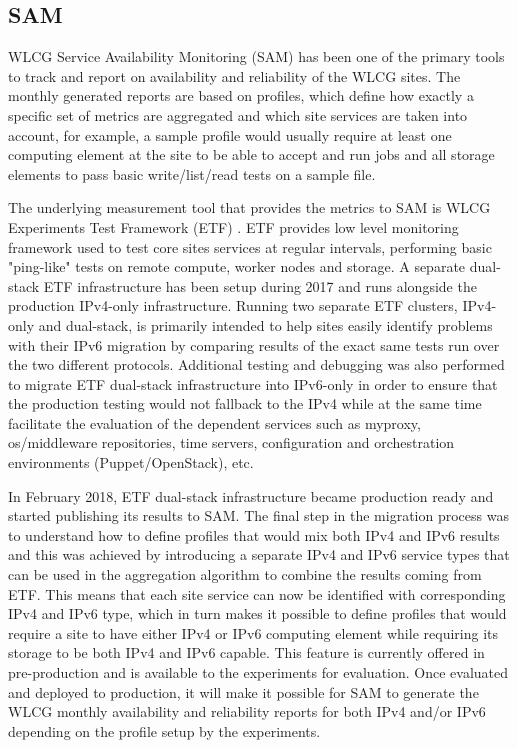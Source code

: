 
\subsection{SAM}
WLCG Service Availability Monitoring (SAM) \cite{sam} has been one of the primary tools to track and report on availability and reliability of the WLCG sites. The monthly generated reports are based on profiles, which define how exactly a specific set of metrics are aggregated and which site services are taken into account, for example, a sample profile would usually require at least one computing element at the site to be able to accept and run jobs and all storage elements to pass basic write/list/read tests on a sample file. 

The underlying measurement tool that provides the metrics to SAM is WLCG Experiments Test Framework (ETF) \cite{etf}. ETF provides low level monitoring framework used to test core sites services at regular intervals, performing basic "ping-like" tests on remote compute, worker nodes and storage. A separate dual-stack ETF infrastructure has been setup during 2017 and runs alongside the production IPv4-only infrastructure. Running two separate ETF clusters, IPv4-only and dual-stack, is primarily intended to help sites easily identify problems with their IPv6 migration by comparing results of the exact same tests run over the two different protocols.  Additional testing and debugging was also performed to migrate ETF dual-stack infrastructure into IPv6-only in order to ensure that the production testing would not fallback to the IPv4 while at the same time facilitate the evaluation of the dependent services such as myproxy, os/middleware repositories, time servers, configuration and orchestration environments (Puppet/OpenStack), etc. 

In February 2018, ETF dual-stack infrastructure became production ready and started publishing its results to SAM. The final step in the migration process was to understand how to define profiles that would mix both IPv4 and IPv6 results and this was achieved by introducing a separate IPv4 and IPv6 service types that can be used in the aggregation algorithm to combine the results coming from ETF. This means that each site service can now be identified with corresponding IPv4 and IPv6 type, which in turn makes it possible to define profiles that would require a site to have either IPv4 or IPv6 computing element while requiring its storage to be both IPv4 and IPv6 capable. This feature is currently offered in pre-production and is available to the experiments for evaluation. Once evaluated and deployed to production, it will make it possible for SAM to generate the WLCG monthly availability and reliability reports for both IPv4 and/or IPv6 depending on the profile setup by the experiments. 

